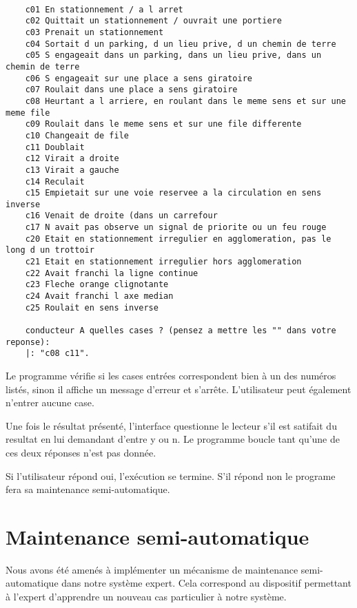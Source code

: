 \begin{lstlisting}[frame=single]

    c01 En stationnement / a l arret
    c02 Quittait un stationnement / ouvrait une portiere
    c03 Prenait un stationnement
    c04 Sortait d un parking, d un lieu prive, d un chemin de terre
    c05 S engageait dans un parking, dans un lieu prive, dans un chemin de terre
    c06 S engageait sur une place a sens giratoire
    c07 Roulait dans une place a sens giratoire
    c08 Heurtant a l arriere, en roulant dans le meme sens et sur une meme file
    c09 Roulait dans le meme sens et sur une file differente
    c10 Changeait de file
    c11 Doublait
    c12 Virait a droite
    c13 Virait a gauche
    c14 Reculait
    c15 Empietait sur une voie reservee a la circulation en sens inverse
    c16 Venait de droite (dans un carrefour
    c17 N avait pas observe un signal de priorite ou un feu rouge
    c20 Etait en stationnement irregulier en agglomeration, pas le long d un trottoir
    c21 Etait en stationnement irregulier hors agglomeration
    c22 Avait franchi la ligne continue
    c23 Fleche orange clignotante
    c24 Avait franchi l axe median
    c25 Roulait en sens inverse

    conducteur A quelles cases ? (pensez a mettre les "" dans votre reponse):
    |: "c08 c11".
\end{lstlisting}

Le programme vérifie si les cases entrées correspondent bien à un des numéros listés, sinon il affiche un message d'erreur et s'arrête.
L'utilisateur peut également n'entrer aucune case.

Une fois le résultat présenté, l'interface questionne le lecteur s'il est satifait du resultat en lui demandant d'entre y ou n. Le programme boucle tant qu'une de ces deux réponses n'est pas donnée.

Si l'utilisateur répond oui, l'exécution se termine. S'il répond non le programe fera sa maintenance semi-automatique.

\section{Maintenance semi-automatique}
Nous avons été amenés à implémenter un mécanisme de maintenance semi-automatique dans notre système expert. Cela correspond au dispositif permettant à l'expert d'apprendre un nouveau cas particulier à notre système.

